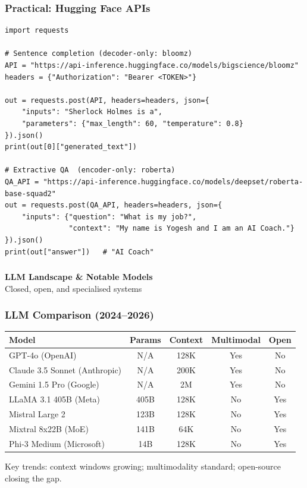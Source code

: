 \begin{frame}[fragile]\frametitle{Practical: Hugging Face APIs}
\begin{lstlisting}
import requests

# Sentence completion (decoder-only: bloomz)
API = "https://api-inference.huggingface.co/models/bigscience/bloomz"
headers = {"Authorization": "Bearer <TOKEN>"}

out = requests.post(API, headers=headers, json={
    "inputs": "Sherlock Holmes is a",
    "parameters": {"max_length": 60, "temperature": 0.8}
}).json()
print(out[0]["generated_text"])

# Extractive QA  (encoder-only: roberta)
QA_API = "https://api-inference.huggingface.co/models/deepset/roberta-base-squad2"
out = requests.post(QA_API, headers=headers, json={
    "inputs": {"question": "What is my job?",
               "context": "My name is Yogesh and I am an AI Coach."}
}).json()
print(out["answer"])   # "AI Coach"
\end{lstlisting}
\end{frame}



\begin{frame}[fragile]\frametitle{}
\begin{center}
{\Large \textbf{LLM Landscape \& Notable Models}}\\[0.5em]
{\normalsize Closed, open, and specialised systems}
\end{center}
\end{frame}

\begin{frame}[fragile]\frametitle{LLM Comparison (2024--2026)}
\begin{center}
\small
\renewcommand{\arraystretch}{1.3}
\begin{tabular}{|l|c|c|c|c|}
\hline
\textbf{Model} & \textbf{Params} & \textbf{Context} & \textbf{Multimodal} & \textbf{Open} \\
\hline
GPT-4o (OpenAI) & N/A & 128K & Yes & No \\
Claude 3.5 Sonnet (Anthropic) & N/A & 200K & Yes & No \\
Gemini 1.5 Pro (Google) & N/A & 2M & Yes & No \\
LLaMA 3.1 405B (Meta) & 405B & 128K & No & Yes \\
Mistral Large 2 & 123B & 128K & No & Yes \\
Mixtral 8x22B (MoE) & 141B & 64K & No & Yes \\
Phi-3 Medium (Microsoft) & 14B & 128K & No & Yes \\
\hline
\end{tabular}
\end{center}
Key trends: context windows growing; multimodality standard; open-source closing the gap.
\end{frame}

